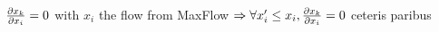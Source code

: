 \begin{theorem} \ \\
  \label{independence}
  ${\partial x_k \over \partial x_i} = 0$ with $x_i$ the flow from MaxFlow $\Rightarrow
    \forall x_i' \leq x_i, {\partial x_k \over \partial x_i} = 0$ ceteris paribus
\end{theorem}
